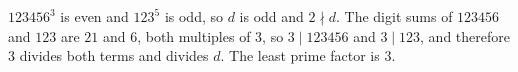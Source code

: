 $123456^3$ is even and $123^5$ is odd, so $d$ is odd and $2\nmid d$. The digit sums of $123456$ and $123$ are $21$ and $6$, both multiples of $3$, so $3\mid123456$ and $3\mid123$, and therefore $3$ divides both terms and divides $d$. The least prime factor is $\boxed{3}$.
